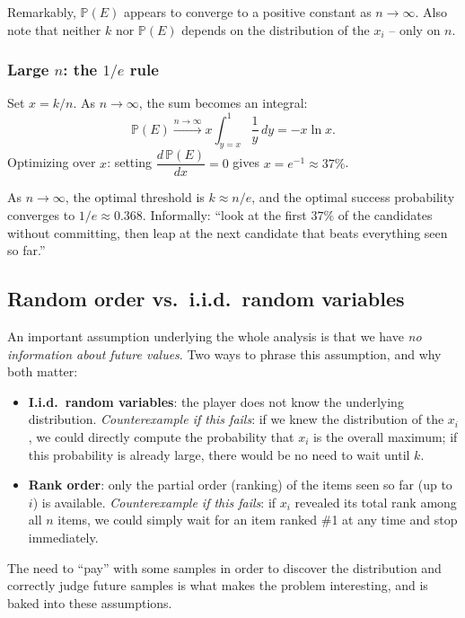 Remarkably, $\mathbb{P}(E)$ appears to converge to a positive constant as $n \to \infty$. Also note that neither $k$ nor $\mathbb{P}(E)$ depends on the distribution of the $x_i$ -- only on $n$.

\subsubsection*{Large $n$: the $1/e$ rule}

Set $x = k/n$. As $n \to \infty$, the sum becomes an integral:
\[
\mathbb{P}(E) \xrightarrow{n \to \infty} x \int_{y=x}^{1} \frac{1}{y}\, dy = -x \ln x.
\]
Optimizing over $x$: setting $\dfrac{d\,\mathbb{P}(E)}{dx} = 0$ gives $x = e^{-1} \approx 37\%$.

\begin{theorem}
As $n \to \infty$, the optimal threshold is $k \approx n/e$, and the optimal success probability converges to $1/e \approx 0.368$. Informally: ``look at the first $37\%$ of the candidates without committing, then leap at the next candidate that beats everything seen so far.''
\end{theorem}

\subsection{Random order vs.\ i.i.d.\ random variables}

An important assumption underlying the whole analysis is that we have \emph{no information about future values}. Two ways to phrase this assumption, and why both matter:

\begin{itemize}
    \item \textbf{I.i.d.\ random variables}: the player does not know the underlying distribution. \emph{Counterexample if this fails}: if we knew the distribution of the $x_i$, we could directly compute the probability that $x_i$ is the overall maximum; if this probability is already large, there would be no need to wait until $k$.
    \item \textbf{Rank order}: only the partial order (ranking) of the items seen so far (up to $i$) is available. \emph{Counterexample if this fails}: if $x_i$ revealed its total rank among all $n$ items, we could simply wait for an item ranked \#1 at any time and stop immediately.
\end{itemize}

The need to ``pay'' with some samples in order to discover the distribution and correctly judge future samples is what makes the problem interesting, and is baked into these assumptions.

